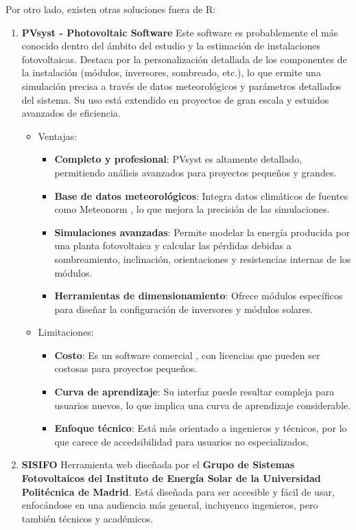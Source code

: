 Por otro lado, existen otras soluciones fuera de R:
\begin{enumerate}
\item \textbf{PVsyst - Photovoltaic Software} \cite{pvsyst}
Este software es probablemente el más conocido dentro del ámbito del estudio y la estimación de instalaciones fotovoltaicas. Destaca por la personalización detallada de los componentes de la instalación (módulos, inversores, sombreado, etc.), lo que ermite una simulación precisa a través de datos meteorológicos y parámetros detallados del sistema. Su uso está extendido en proyectos de gran escala y estuidos avanzados de eficiencia.
\begin{itemize}
\item Ventajas:
\begin{itemize}
\item \textbf{Completo y profesional}: PVsyst es altamente detallado, permitiendo análisis avanzados para proyectos pequeños y grandes.
\item \textbf{Base de datos meteorológicos}: Integra datos climáticos de fuentes como Meteonorm \cite{jan20}, lo que mejora la precisión de las simulaciones.
\item \textbf{Simulaciones avanzadas}: Permite modelar la energía producida por una planta fotovoltaica y calcular las pérdidas debidas a sombreamiento, inclinación, orientaciones y resistencias internas de los módulos.
\item \textbf{Herramientas de dimensionamiento}: Ofrece módulos específicos para diseñar la configuración de inversores y módulos solares.
\end{itemize}
\item Limitaciones:
\begin{itemize}
\item \textbf{Costo}: Es un software comercial , con licencias que pueden ser costosas para proyectos pequeños.
\item \textbf{Curva de aprendizaje}: Su interfaz puede resultar compleja para usuarios nuevos, lo que implica una curva de aprendizaje considerable.
\item \textbf{Enfoque técnico}: Está más orientado a ingenieros y técnicos, por lo que carece de accedsibilidad para usuarios no especializados.
\end{itemize}
\end{itemize}
\item \textbf{SISIFO} \cite{sisifo}
Herramienta web diseñada por el \textbf{Grupo de Sistemas Fotovoltaicos del Instituto de Energía Solar de la Universidad Politécnica de Madrid}. Está diseñada para ser accesible y fácil de usar, enfocándose en una audiencia más general, incluyenco ingenieros, pero también técnicos y académicos.

\end{enumerate}
